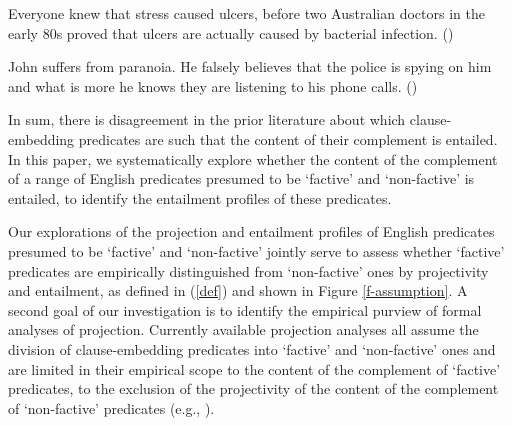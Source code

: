 \documentclass[11pt,fleqn]{article}
\newcommand{\6}{\mbox{$[\hspace*{-.6mm}[$}}
\newcommand{\9}{\mbox{$]\hspace*{-.6mm}]$}}
\begin{document}
\begin{exe}
\ex\label{fis}
\begin{xlist}

\ex Everyone knew that stress caused ulcers, before two Australian doctors in the early 80s proved that ulcers are actually caused by bacterial infection. \hfill (\citealt[501]{hazlett2010})

\ex John suffers from paranoia. He falsely believes that the police is spying on him and what is more he knows they are listening to his phone calls. \hfill (\citealt[514]{abrusan2011})



\end{xlist}

\end{exe}

In sum, there is disagreement in the prior literature about which clause-embedding predicates are such that the content of their complement is entailed. In this paper, we systematically explore whether the content of the complement of a range of English predicates presumed to be `factive' and `non-factive' is entailed, to identify the entailment profiles of these predicates.

Our explorations of the projection and entailment profiles of English predicates presumed to be `factive' and `non-factive' jointly serve to assess whether `factive' predicates are empirically distinguished from `non-factive' ones by projectivity and entailment, as defined in (\ref{def}) and shown in Figure \ref{f-assumption}. A second goal of our investigation is to identify the empirical purview of formal analyses of projection. Currently available projection analyses all assume the division of clause-embedding predicates into `factive' and `non-factive' ones and are limited in their empirical scope to the content of the complement of `factive' predicates, to the exclusion of the projectivity of the content of the complement of `non-factive' predicates (e.g., \citealt{heim83,vds92,schlenker10,abrusan2011,abrusan2016,romoli2015,best-question}). 
\end{document}
